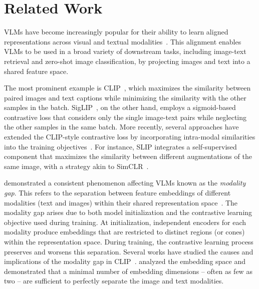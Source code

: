 \section{Related Work}
\label{sec:related_work}
VLMs have become increasingly popular for their ability to learn aligned representations across visual and textual modalities~\citep{radford2021learning, jia2021scaling, zhai2022lit, zhai2023sigmoid, mu2022slip, li2021supervision}. 
This alignment enables VLMs to be used in a broad variety of downstream tasks, including image-text retrieval and zero-shot image classification, by projecting images and text into a shared feature space.

The most prominent example is CLIP~\citep{radford2021learning}, which maximizes the similarity between paired images and text captions while minimizing the similarity with the other samples in the batch. SigLIP~\citep{zhai2023sigmoid}, on the other hand, employs a sigmoid-based contrastive loss that considers only the single image-text pairs while neglecting the other samples in the same batch.
More recently, several approaches have extended the CLIP-style contrastive loss by incorporating intra-modal similarities into the training objectives~\citep{mu2022slip, li2021supervision}. For instance, SLIP \citep{mu2022slip} integrates a self-supervised component that maximizes the similarity between different augmentations of the same image, with a strategy akin to SimCLR~\citep{chen2020simple}. 

\citet{liang2022mind} demonstrated a consistent phenomenon affecting VLMs known as the \textit{modality gap}. This refers to the separation between feature embeddings of different modalities (\eg text and images) within their shared representation space~\citep{liang2022mind}. The modality gap arises due to both model initialization and the contrastive learning objective used during training. At initialization, independent encoders for each modality produce embeddings that are restricted to distinct regions (or cones) within the representation space. During training, the contrastive learning process preserves and worsens this separation. Several works have studied the causes and implications of the modality gap in CLIP~\citep{ shi2023towards, schrodi2024two, zhang2023diagnosing}. \citet{schrodi2024two} analyzed the embedding space and demonstrated that a minimal number of embedding dimensions -- often as few as two -- are sufficient to perfectly separate the image and text modalities. 

